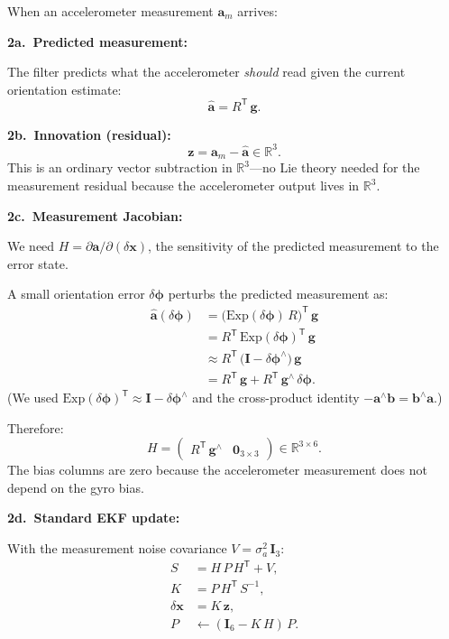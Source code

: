 \documentclass[11pt,letterpaper]{article}
\newcommand{\R}{\mathbb{R}}
\newcommand{\expmap}{\mathrm{Exp}}
\newcommand{\eye}{\mathbf{I}}
\begin{document}
When an accelerometer measurement $\mathbf{a}_m$ arrives:

\medskip
\noindent\textbf{2a.\ Predicted measurement:}

The filter predicts what the accelerometer \emph{should} read given
the current orientation estimate:
\[
  \hat{\mathbf{a}} = R^{\mathsf{T}}\,\mathbf{g}.
\]

\noindent\textbf{2b.\ Innovation (residual):}
\[
  \mathbf{z} = \mathbf{a}_m - \hat{\mathbf{a}} \in \R^{3}.
\]
This is an ordinary vector subtraction in $\R^{3}$---no Lie theory
needed for the measurement residual because the accelerometer
output lives in $\R^{3}$.

\medskip
\noindent\textbf{2c.\ Measurement Jacobian:}

We need $H = \partial\mathbf{a}/\partial(\delta\mathbf{x})$, the
sensitivity of the predicted measurement to the error state.

A small orientation error $\delta\bm{\phi}$ perturbs the predicted
measurement as:
\begin{align*}
  \hat{\mathbf{a}}(\delta\bm{\phi})
  &= \bigl(\expmap(\delta\bm{\phi})\,R\bigr)^{\mathsf{T}}\,
    \mathbf{g}
  \\
  &= R^{\mathsf{T}}\,
    \expmap(\delta\bm{\phi})^{\mathsf{T}}\,\mathbf{g}
  \\
  &\approx R^{\mathsf{T}}\,
    \bigl(\eye - \delta\bm{\phi}^{\wedge}\bigr)\,\mathbf{g}
  \\
  &= R^{\mathsf{T}}\,\mathbf{g}
    + R^{\mathsf{T}}\,\mathbf{g}^{\wedge}\,\delta\bm{\phi}.
\end{align*}
(We used
$\expmap(\delta\bm{\phi})^{\mathsf{T}}
\approx \eye - \delta\bm{\phi}^{\wedge}$
and the cross-product identity
$-\mathbf{a}^{\wedge}\mathbf{b}
= \mathbf{b}^{\wedge}\mathbf{a}$.)

Therefore:
\[
  \boxed{
  H = \begin{pmatrix}
    R^{\mathsf{T}}\,\mathbf{g}^{\wedge}
    & \mathbf{0}_{3 \times 3}
  \end{pmatrix}
  \in \R^{3 \times 6}.
  }
\]
The bias columns are zero because the accelerometer measurement
does not depend on the gyro bias.

\medskip
\noindent\textbf{2d.\ Standard EKF update:}

With the measurement noise covariance
$V = \sigma_{a}^{2}\,\eye_{3}$:
\begin{align}
  S &= H\,P\,H^{\mathsf{T}} + V, \label{eq:S}\\
  K &= P\,H^{\mathsf{T}}\,S^{-1}, \label{eq:K}\\
  \delta\mathbf{x} &= K\,\mathbf{z}, \label{eq:dx}\\
  P &\leftarrow (\eye_{6} - K\,H)\,P. \label{eq:Pupd}
\end{align}
\end{document}

